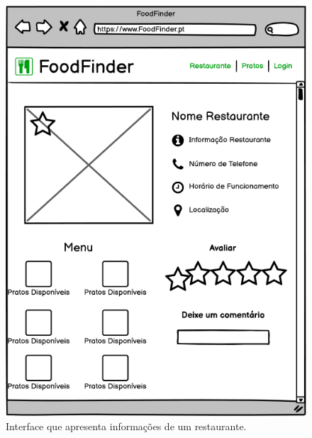 \documentclass[a4paper,12pt]{report}
\begin{document}
	\begin{figure}[H]
	\begin{center}
	\includegraphics[scale=0.60]{Screen_Restaurante}	
	\end{center}
	\caption{Interface que apresenta informações de um restaurante.}
	\label{fig:Screen_Restaurante}	
	\end{figure} 
	
\end{document}
